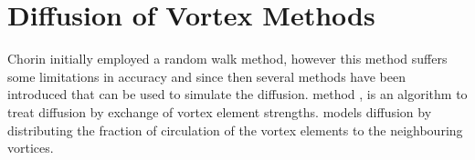%
\section{Diffusion of Vortex Methods}
\label{sec:diffusionVM}

Chorin initially employed a random walk method, however this method suffers some limitations in accuracy and since then several methods have been introduced that can be used to simulate the diffusion.  method \cite{Degond1989}, is an algorithm to treat diffusion by exchange of vortex element strengths.  \cite{Shankar1996} models diffusion by distributing the fraction of circulation of the vortex elements to the neighbouring vortices. 


%
%
